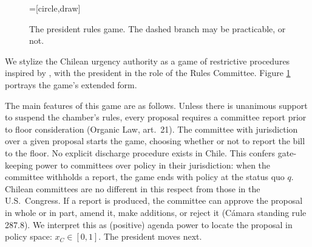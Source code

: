 \documentclass[letter,12pt]{article}
\begin{document}
\begin{figure}
  \centering
    \caption{The president rules game. The dashed branch may be practicable, or not.}\label{F:game}
    =[circle,draw]
\end{figure}

We stylize the Chilean urgency authority as a game of restrictive procedures inspired by \citet{dion.huber.1996}, with the president in the role of the Rules Committee. Figure \ref{F:game} portrays the game's extended form.

The main features of this game are as follows. Unless there is unanimous support to suspend the chamber's rules, every proposal requires a committee report prior to floor consideration (Organic Law, art.~21). The committee with jurisdiction over a given proposal starts the game, choosing whether or not to report the bill to the floor. No explicit discharge procedure exists in Chile. This confers gate-keeping power to committees over policy in their jurisdiction: when the committee withholds a report, the game ends with policy at the status quo $q$. Chilean committees are no different in this respect from those in the U.S.\ Congress. If a report is produced, the committee can approve the proposal in whole or in part, amend it, make additions, or reject it (Cámara standing rule 287.8). We interpret this as (positive) agenda power to locate the proposal in policy space: $x_C \in [0,1]$. The president moves next. 
\end{document}
